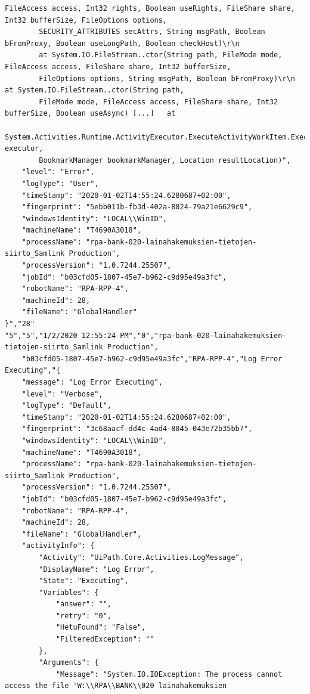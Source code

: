 \begin{Verbatim}[fontsize=\tiny]
        FileAccess access, Int32 rights, Boolean useRights, FileShare share, Int32 bufferSize, FileOptions options,
        SECURITY_ATTRIBUTES secAttrs, String msgPath, Boolean bFromProxy, Boolean useLongPath, Boolean checkHost)\r\n
        at System.IO.FileStream..ctor(String path, FileMode mode, FileAccess access, FileShare share, Int32 bufferSize,
        FileOptions options, String msgPath, Boolean bFromProxy)\r\n   at System.IO.FileStream..ctor(String path,
        FileMode mode, FileAccess access, FileShare share, Int32 bufferSize, Boolean useAsync) [...]   at
        System.Activities.Runtime.ActivityExecutor.ExecuteActivityWorkItem.ExecuteBody(ActivityExecutor executor,
        BookmarkManager bookmarkManager, Location resultLocation)",
    "level": "Error",
    "logType": "User",
    "timeStamp": "2020-01-02T14:55:24.6280687+02:00",
    "fingerprint": "5ebb011b-fb3d-402a-8024-79a21e6629c9",
    "windowsIdentity": "LOCAL\\WinID",
    "machineName": "T4690A3018",
    "processName": "rpa-bank-020-lainahakemuksien-tietojen-siirto_Samlink Production",
    "processVersion": "1.0.7244.25507",
    "jobId": "b03cfd05-1807-45e7-b962-c9d95e49a3fc",
    "robotName": "RPA-RPP-4",
    "machineId": 28,
    "fileName": "GlobalHandler"
}","28"
"5","5","1/2/2020 12:55:24 PM","0","rpa-bank-020-lainahakemuksien-tietojen-siirto_Samlink Production",
    "b03cfd05-1807-45e7-b962-c9d95e49a3fc","RPA-RPP-4","Log Error Executing","{
    "message": "Log Error Executing",
    "level": "Verbose",
    "logType": "Default",
    "timeStamp": "2020-01-02T14:55:24.6280687+02:00",
    "fingerprint": "3c68aacf-dd4c-4ad4-8045-043e72b35bb7",
    "windowsIdentity": "LOCAL\\WinID",
    "machineName": "T4690A3018",
    "processName": "rpa-bank-020-lainahakemuksien-tietojen-siirto_Samlink Production",
    "processVersion": "1.0.7244.25507",
    "jobId": "b03cfd05-1807-45e7-b962-c9d95e49a3fc",
    "robotName": "RPA-RPP-4",
    "machineId": 28,
    "fileName": "GlobalHandler",
    "activityInfo": {
        "Activity": "UiPath.Core.Activities.LogMessage",
        "DisplayName": "Log Error",
        "State": "Executing",
        "Variables": {
            "answer": "",
            "retry": "0",
            "HetuFound": "False",
            "FilteredException": ""
        },
        "Arguments": {
            "Message": "System.IO.IOException: The process cannot access the file 'W:\\RPA\\BANK\\020 lainahakemuksien

\end{Verbatim}
